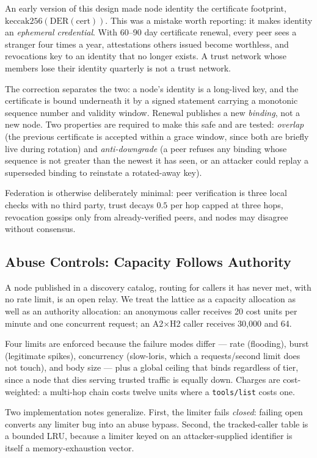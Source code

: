 \documentclass[11pt]{article}
\begin{document}
An early version of this design made node identity the certificate footprint,
$\mathrm{keccak256}(\mathrm{DER}(\mathrm{cert}))$. This was a mistake worth
reporting: it makes identity an \emph{ephemeral credential}. With 60--90 day
certificate renewal, every peer sees a stranger four times a year, attestations
others issued become worthless, and revocations key to an identity that no longer
exists. A trust network whose members lose their identity quarterly is not a
trust network.

The correction separates the two: a node's identity is a long-lived key, and the
certificate is bound underneath it by a signed statement carrying a monotonic
sequence number and validity window. Renewal publishes a new \emph{binding}, not
a new node. Two properties are required to make this safe and are tested:
\emph{overlap} (the previous certificate is accepted within a grace window, since
both are briefly live during rotation) and \emph{anti-downgrade} (a peer refuses
any binding whose sequence is not greater than the newest it has seen, or an
attacker could replay a superseded binding to reinstate a rotated-away key).

Federation is otherwise deliberately minimal: peer verification is three local
checks with no third party, trust decays $0.5$ per hop capped at three hops,
revocation gossips only from already-verified peers, and nodes may disagree
without consensus.

\subsection{Abuse Controls: Capacity Follows Authority}\label{sec:abuse}

A node published in a discovery catalog, routing for callers it has never met,
with no rate limit, is an open relay. We treat the lattice as a capacity
allocation as well as an authority allocation: an anonymous caller receives 20
cost units per minute and one concurrent request; an A2$\times$H2 caller receives
30{,}000 and 64.

Four limits are enforced because the failure modes differ --- rate (flooding),
burst (legitimate spikes), concurrency (slow-loris, which a requests/second limit
does not touch), and body size --- plus a global ceiling that binds regardless of
tier, since a node that dies serving trusted traffic is equally down. Charges are
cost-weighted: a multi-hop chain costs twelve units where a \texttt{tools/list}
costs one.

Two implementation notes generalize. First, the limiter fails \emph{closed}:
failing open converts any limiter bug into an abuse bypass. Second, the
tracked-caller table is a bounded LRU, because a limiter keyed on an
attacker-supplied identifier is itself a memory-exhaustion vector.
\end{document}

